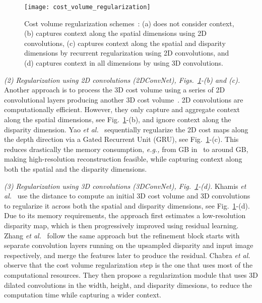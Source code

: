 \documentclass[10pt,journal,compsoc]{IEEEtran}
\newcommand{\eg}{\emph{e.g., }}
\newcommand{\etal}{\emph{et al.}}
\newcommand{\noi}{\noindent}
\begin{document}
\begin{figure}[t]
\centering
	\texttt{[image: cost\_volume\_regularization]}
	\caption{\label{fig:cost_volume_regularization}Cost volume regularization schemes~\cite{Yao_2019_CVPR}: (a) does not consider context, (b) captures context along the spatial dimensions using 2D convolutions, (c) captures context along the spatial and disparity dimensions by recurrent regularization using 2D convolutions, and (d) captures context in all dimensions by using 3D convolutions.   }
\end{figure}



\vspace{6pt}
\noi\textit{(2) Regularization using 2D convolutions (2DConvNet), Figs.~\ref{fig:cost_volume_regularization}-(b) and (c). } Another  approach is to process the 3D cost volume using a series of 2D convolutional layers producing another 3D cost volume~\cite{mayer2016large,dosovitskiy2015flownet,pang2017cascade,liang2018learning}. 2D convolutions are computationally efficient. However, they only capture and aggregate context along the spatial dimensions, see Fig.~\ref{fig:cost_volume_regularization}-(b),  and ignore context along the disparity dimension. Yao \etal~\cite{Yao_2019_CVPR}  sequentially regularize the 2D cost maps along the depth direction via a Gated Recurrent Unit (GRU), see Fig.~\ref{fig:cost_volume_regularization}-(c). This reduces drastically the memory consumption, \eg from  GB in~\cite{yao2018mvsnet} to around GB,  making high-resolution reconstruction feasible, while  capturing context along both the spatial  and the disparity dimensions. 


\vspace{6pt}
\noi\textit{(3) Regularization using 3D convolutions (3DConvNet), Fig.~\ref{fig:cost_volume_regularization}-(d). } Khamis \etal~\cite{khamis2018stereonet}  use the  distance to compute an initial 3D cost volume and 3D convolutions to regularize it across  both the spatial  and disparity dimensions, see Fig.~\ref{fig:cost_volume_regularization}-(d).  Due to its memory requirements, the approach first estimates a low-resolution disparity map, which is then progressively improved using residual learning.   Zhang \etal~\cite{zhang2018activestereonet} follow the same approach but the refinement block starts with separate convolution layers running on the upsampled disparity and input image respectively, and merge the features later to produce the residual.  Chabra \etal~\cite{chabra2019stereodrnet} observe that the cost volume regularization step is the one that uses most of the computational resources.  They then propose a regularization module that uses 3D dilated  convolutions  in the width, height, and disparity dimesions, to reduce the computation time while capturing a wider context.
\end{document}
